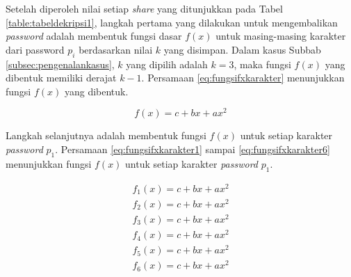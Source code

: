 Setelah diperoleh nilai setiap \textit{share} yang ditunjukkan pada Tabel \ref{table:tabeldekripsi1}, langkah pertama yang dilakukan untuk mengembalikan \textit{password} adalah membentuk fungsi dasar \begin{math}f(x)\end{math} untuk masing-masing karakter dari password \begin{math}p_i\end{math} berdasarkan nilai \begin{math}k\end{math} yang disimpan. Dalam kasus Subbab \ref{subsec:pengenalankasus}, \begin{math}k\end{math} yang dipilih adalah \begin{math}k=3\end{math}, maka fungsi \begin{math}f(x)\end{math} yang dibentuk memiliki derajat \begin{math}k-1\end{math}. Persamaan \ref{eq:fungsifxkarakter} menunjukkan fungsi \begin{math}f(x)\end{math} yang dibentuk.

\begin{equation}
	f(x) = c + bx + ax^2 \label{eq:fungsifxkarakter}
\end{equation}

Langkah selanjutnya adalah membentuk fungsi \begin{math}f(x)\end{math} untuk setiap karakter \textit{password} \begin{math}p_1\end{math}. Persamaan \ref{eq:fungsifxkarakter1} sampai \ref{eq:fungsifxkarakter6} menunjukkan fungsi \begin{math}f(x)\end{math} untuk setiap karakter \textit{password} \begin{math}p_1\end{math}.

\begin{align}
	f_1(x) = c + bx + ax^2 \label{eq:fungsifxkarakter1} \\
	f_2(x) = c + bx + ax^2 \label{eq:fungsifxkarakter2} \\
	f_3(x) = c + bx + ax^2 \label{eq:fungsifxkarakter3} \\
	f_4(x) = c + bx + ax^2 \label{eq:fungsifxkarakter4} \\
	f_5(x) = c + bx + ax^2 \label{eq:fungsifxkarakter5} \\
	f_6(x) = c + bx + ax^2 \label{eq:fungsifxkarakter6}
\end{align}

